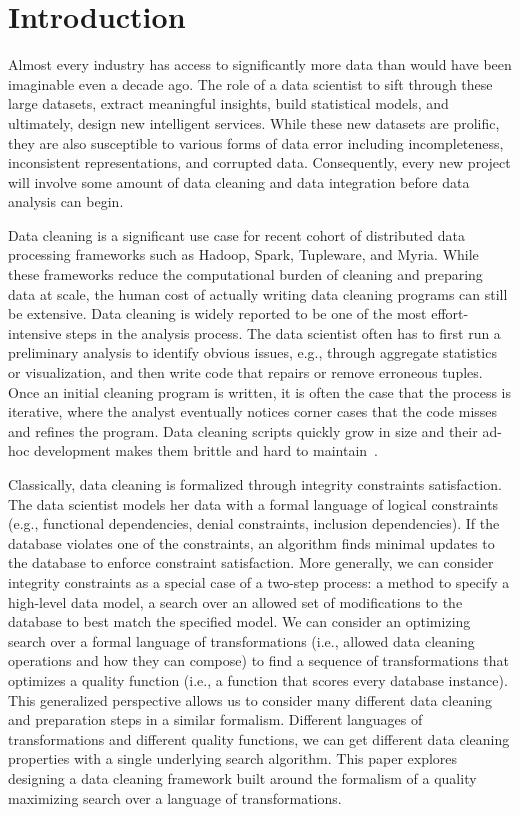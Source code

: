 \section{Introduction}\label{intro}\sloppy
Almost every industry has access to significantly more data than would have been imaginable even a decade ago.
The role of a data scientist to sift through these large datasets, extract meaningful insights, build statistical models, and ultimately, design new  intelligent services. 
While these new datasets are prolific, they are also susceptible to various forms of data error including incompleteness, inconsistent representations, and corrupted data.
Consequently, every new project will involve some amount of data cleaning and data integration before data analysis can begin.

Data cleaning is a significant use case for recent cohort of distributed data processing frameworks such as Hadoop, Spark, Tupleware, and Myria.
While these frameworks reduce the computational burden of cleaning and preparing data at scale, the human cost of actually writing data cleaning programs can still be extensive.
Data cleaning is widely reported to be one of the most effort-intensive steps in the analysis process. 
The data scientist often has to first run a preliminary analysis to identify obvious issues, e.g., through aggregate statistics or visualization, and then write code that repairs or remove erroneous tuples.
Once an initial cleaning program is written, it is often the case that the process is iterative, where the analyst eventually notices corner cases that the code misses and refines the program. 
Data cleaning scripts quickly grow in size and their ad-hoc development makes them brittle and hard to maintain~\cite{krishnan2016hilda}.

Classically, data cleaning is formalized through integrity constraints satisfaction. The data scientist models her data with a formal language of logical constraints (e.g., functional dependencies, denial constraints, inclusion dependencies). If the database violates one of the constraints, an algorithm finds minimal updates to the database to enforce constraint satisfaction.
More generally, we can consider integrity constraints as a special case of a two-step process: a method to specify a high-level data model, a search over an allowed set of modifications to the database to best match the specified model.
We can consider an optimizing search over a formal language of transformations (i.e., allowed data cleaning operations and how they can compose) to find a sequence of transformations that optimizes a quality function (i.e., a function that scores every database instance).
This generalized perspective allows us to consider many different data cleaning and preparation steps in a similar formalism.
Different languages of transformations and different quality functions, we can get different data cleaning properties with a single underlying search algorithm.
This paper explores designing a data cleaning framework built around the formalism of a quality maximizing search over a language of transformations.

